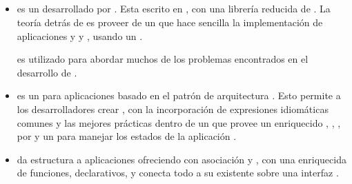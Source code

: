 \subsection{\clientSideAS}
	\begin{itemize}
		\item 
			\textbf{\angularjsNAME} es un \frameworkPC \clientSideAS desarrollado por \googleNAME. Esta escrito en \javaScriptNAME, con una librería reducida de \jqueryNAME. La teoría detrás de \angularjsNAME es proveer de un \frameworkPC que hace sencilla la implementación de aplicaciones y \webPageINT \wellDesignQA y \structuredQA, usando un \frameworkPC \mvcAS \cite{book_technology_node_mongo_angular_development}. 

			\angularjsNAME es utilizado para abordar muchos de los problemas encontrados en el desarrollo de \singlePageAppINT \cite{technology_angularjs}.

		\item 
			\textbf{\emberjsNAME} \cite{online_technology_emberjs} es un \frameworkPC \openSourcePC \clientSideAS \javaScriptNAME para aplicaciones \webINT basado en el patrón de arquitectura \mvcAS. Esto permite a los desarrolladores crear \singlePageAppINT \scalablesQA \cite{online_Enterprise_Moving_SinglePage_Design}, con la incorporación de expresiones idiomáticas comunes y las mejores prácticas dentro de un  \frameworkPC que provee un enriquecido \objectModelPL, \dataBindingPL \declarativePL \twoWayINT, \computedPropEmberAS, \templatesAS \autoUpdatedAS \poweredCPT por \handlebarsNAME y un \routerPC para manejar los estados de la aplicación \cite{online_technology_emberjs_getting_into}.

		\item
			\textbf{\backbonejsNAME} da estructura a aplicaciones \webINT ofreciendo \textbf{\modelsCustom} con asociación \keyValue y \events \custom, \textbf{\collectionsDB} con una \api enriquecida de funciones, \textbf{\viewsAS} \handling \event declarativos, y conecta todo a su \api existente sobre una interfaz \jsonNAME \restful \cite{online_technology_backbone}.
		


\end{itemize}
